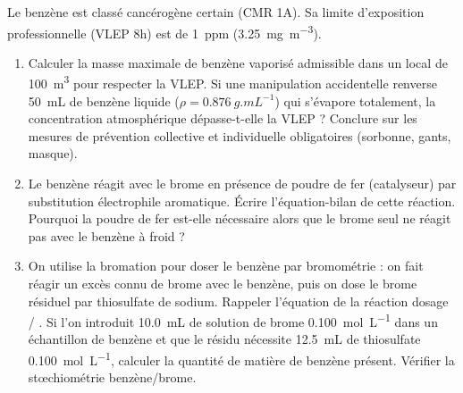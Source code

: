 \documentclass[11pt]{article}
\begin{document}
\begin{exercice}
Le benzène est classé cancérogène certain (CMR 1A). Sa limite d'exposition professionnelle (VLEP 8h) est de \SI{1}{ppm} (\SI{3,25}{mg.m^{-3}}).
\begin{enumerate}
    \item Calculer la masse maximale de benzène vaporisé admissible dans un local de \SI{100}{m^3} pour respecter la VLEP. Si une manipulation accidentelle renverse \SI{50}{mL} de benzène liquide ($\rho = \SI{0,876}{g.mL^{-1}}$) qui s'évapore totalement, la concentration atmosphérique dépasse-t-elle la VLEP ? Conclure sur les mesures de prévention collective et individuelle obligatoires (sorbonne, gants, masque).
    \item Le benzène réagit avec le brome en présence de poudre de fer (catalyseur) par substitution électrophile aromatique. Écrire l'équation-bilan de cette réaction. Pourquoi la poudre de fer est-elle nécessaire alors que le brome seul ne réagit pas avec le benzène à froid ?
    \item On utilise la bromation pour doser le benzène par bromométrie : on fait réagir un excès connu de brome avec le benzène, puis on dose le brome résiduel par thiosulfate de sodium. Rappeler l'équation de la réaction dosage  / . Si l'on introduit \SI{10,0}{mL} de solution de brome \SI{0,100}{mol.L^{-1}} dans un échantillon de benzène et que le résidu nécessite \SI{12,5}{mL} de thiosulfate \SI{0,100}{mol.L^{-1}}, calculer la quantité de matière de benzène présent. Vérifier la stœchiométrie benzène/brome.
\end{enumerate}
\end{exercice}
\end{document}
